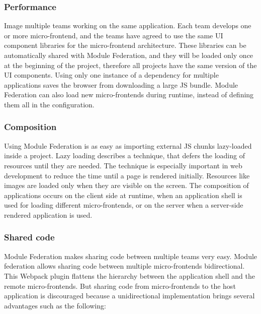 \subsubsection{Performance}\label{subsubsection:background:micro-frontend:module-federation:performance}

Image multiple teams working on the same application. Each team develops one or more micro-frontend, and the teams have agreed to use the same \ac{UI} component libraries for the micro-frontend architecture. These libraries can be automatically shared with Module Federation, and they will be loaded only once at the beginning of the project, therefore all projects have the same version of the \ac{UI} components. Using only one instance of a dependency for multiple applications saves the browser from downloading a large \ac{JS} bundle. Module Federation can also load new micro-frontends during runtime, instead of defining them all in the configuration. \cite[83]{book:2021:mezzalira:applied-methods:building-micro-frontends}

\subsubsection{Composition}\label{subsubsection:background:micro-frontend:module-federation:composition}

Using Module Federation is as easy as importing external \ac{JS} chunks lazy-loaded inside a project. Lazy loading describes a technique, that defers the loading of resources until they are needed. The technique is especially important in web development to reduce the time until a page is rendered initially. Resources like images are loaded only when they are visible on the screen. The composition of applications occurs on the client side at runtime, when an application shell is used for loading different micro-frontends, or on the server when a server-side rendered application is used. \cite[84]{book:2021:mezzalira:applied-methods:building-micro-frontends}

\subsubsection{Shared code}\label{subsubsection:background:micro-frontend:module-federation:shared-code}

Module Federation makes sharing code between multiple teams very easy. Module federation allows sharing code between multiple micro-frontends bidirectional. This Webpack plugin flattens the hierarchy between the application shell and the remote micro-frontends. But sharing code from micro-frontends to the host application is discouraged because a unidirectional implementation brings several advantages such as the following: \cite[84]{book:2021:mezzalira:applied-methods:building-micro-frontends}

